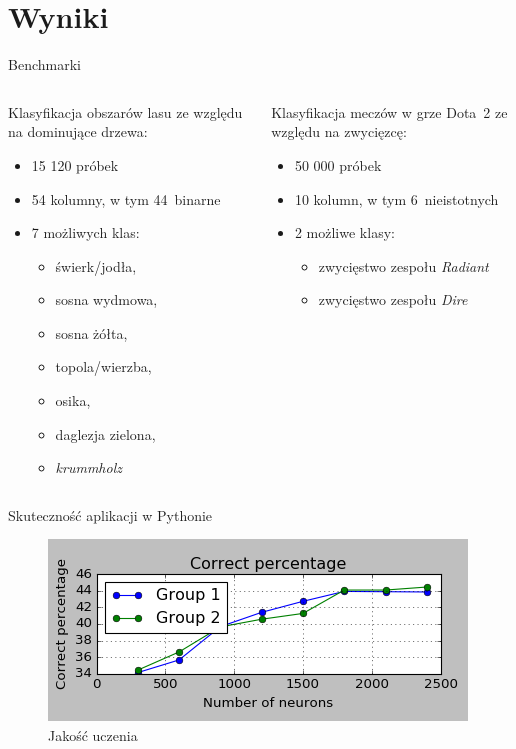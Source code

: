\documentclass{beamer}
\begin{document}
\section{Wyniki}
\begin{frame}{Benchmarki}

\begin{columns}
\begin{column}[T]{0.5\textwidth}
Klasyfikacja obszarów lasu ze względu na dominujące drzewa:

\begin{itemize}
\item 15 120 próbek
\item 54 kolumny, w tym 44~binarne
\item 7 możliwych klas:
\begin{itemize}
\item świerk/jodła,
\item sosna wydmowa,
\item sosna żółta,
\item topola/wierzba,
\item osika,
\item daglezja zielona,
\item \textit{krummholz}
\end{itemize}
\end{itemize}
\end{column}
\begin{column}[T]{0.5\textwidth}
Klasyfikacja meczów w grze Dota~2 ze względu na zwycięzcę:

\begin{itemize}
\item 50 000 próbek
\item 10 kolumn, w tym 6~nieistotnych
\item 2 możliwe klasy:
\begin{itemize}
\item zwycięstwo zespołu \textit{Radiant}
\item zwycięstwo zespołu \textit{Dire}
\end{itemize}
\end{itemize}
\end{column}
\end{columns}

\end{frame}

\begin{frame}{Skuteczność aplikacji w Pythonie}
\begin{figure}[H]
\includegraphics[width=\textwidth]{wyniki_forest_python_percentage.png}
\caption{Jakość uczenia}
\end{figure}
\end{frame}
\end{document}
